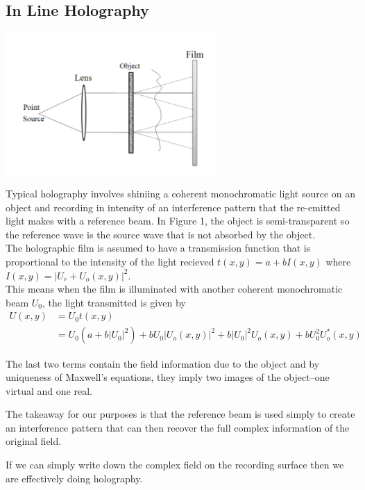 \documentclass{article}
\begin{document}
\subsection{In Line Holography}
    \begin{center}
        \includegraphics[width=8cm]{Gabor holography.png}
    \end{center}
    Typical holography involves shiniing a coherent monochromatic light source on an object and recording in intensity of an interference pattern that the re-emitted light makes with a reference beam. In Figure 1, the object is semi-transparent so the reference wave is the source wave that is not absorbed by the object.\cite{Gabor Holography}\\
    
    The holographic film is assumed to have a transmission function that is proportional to the intensity of the light recieved $t(x,y) = a + bI(x,y)$ where $I(x,y) = |U_r + U_o(x,y)|^2$. \\
    
    This means when the film is illuminated with another coherent monochromatic beam $U_0$, the light transmitted is given by 
    \begin{align}
        U(x,y) &= U_0 t(x,y)\\
        &= U_0(a+b|U_0|^2) + bU_0|U_o(x,y)|^2 + b|U_0|^2U_o(x,y) + b U_0^2 U_o^*(x,y)
    \end{align}
    
    The last two terms contain the field information due to the object and by uniqueness of Maxwell's equations, they imply two images of the object--one virtual and one real.
    
    The takeaway for our purposes is that the reference beam is used simply to create an interference pattern that can then recover the full complex information of the original field. 
    
    If we can simply write down the complex field on the recording surface then we are effectively doing holography.
    
\end{document}
